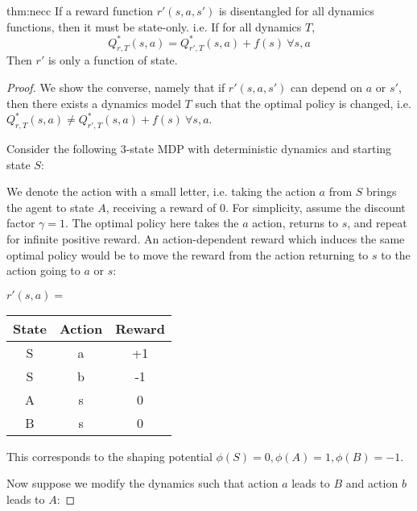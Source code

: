 \documentclass{article} \usepackage{iclr2018_conference,times}
\begin{document}
\begin{reptheorem}{thm:necc}
If a reward function $r'(s,a,s')$ is disentangled for all dynamics functions, then it must be state-only. i.e. If for all dynamics $T$,
\[Q^*_{r, T}(s,a) = Q^*_{r', T}(s,a) + f(s)\ \forall{s,a}\]
Then $r'$ is only a function of state.
\end{reptheorem}
\begin{proof}
We show the converse, namely that if $r'(s,a,s')$ can depend on $a$ or $s'$, then there exists a dynamics model $T$ such that the optimal policy is changed, i.e. $Q^*_{r, T}(s,a) \neq Q^*_{r', T}(s,a) + f(s)\ \forall{s,a}$.

Consider the following 3-state MDP with deterministic dynamics and starting state $S$:

\begin{figure}[h]
\centering
{}
\end{figure}

We denote the action with a small letter, i.e. taking the action $a$ from $S$ brings the agent to state $A$, receiving a reward of $0$. For simplicity, assume the discount factor $\gamma=1$. The optimal policy here takes the $a$ action, returns to $s$, and repeat for infinite positive reward. An action-dependent reward which induces the same optimal policy would be to move the reward from the action returning to $s$ to the action going to $a$ or $s$:
\begin{center}
$r'(s,a) = $
\begin{tabular}{ |c|c|c| } 
 \hline
 State & Action & Reward \\ 
 \hline 
 S & a & +1 \\ 
 S & b & -1 \\ 
 A & s & 0 \\ 
 B & s & 0 \\ 
 \hline
\end{tabular}
\end{center}

This corresponds to the shaping potential $\phi(S) = 0, \phi(A)=1, \phi(B)=-1$.

Now suppose we modify the dynamics such that action $a$ leads to $B$ and action $b$ leads to $A$:


\end{proof}
\end{document}
